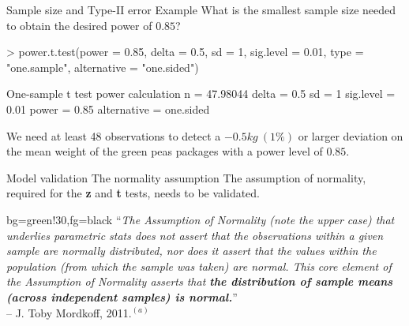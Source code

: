 \documentclass[t]{beamer}
\begin{document}
\begin{ftstf}
{Sample size and Type-II error}
{Example}
What is the smallest sample size needed to obtain the desired power of $0.85$?
\vhalf
\begin{rcode}
> power.t.test(power = 0.85, delta = 0.5, sd = 1, sig.level = 0.01,
               type = "one.sample", alternative = "one.sided")

One-sample t test power calculation 
n = 47.98044
delta = 0.5
sd = 1
sig.level = 0.01
power = 0.85
alternative = one.sided
\end{rcode}
\vhalf
We need at least 48 observations to detect a $-0.5kg\ (1\%)$ or larger deviation on the mean weight of the green peas packages with a power level of $0.85$.
\end{ftstf}

\begin{ftst}
{Model validation}
{The normality assumption}
The assumption of normality, required for the \textbf{z} and \textbf{t} tests, needs to be validated.
	\begin{colorblock}{}{bg=green!30,fg=black}
	``\textit{The Assumption of Normality (note the upper case) that underlies parametric stats does not assert that the observations within a given sample are normally distributed, nor does it assert that the values within the population (from which the sample was taken) are normal. This core element of the Assumption of Normality asserts that \textbf{the distribution of sample means (across independent samples) is normal.}}''\\
	\flushright -- J. Toby Mordkoff, 2011.$^{(a)}$
	\end{colorblock}

\end{ftst}
\end{document}
